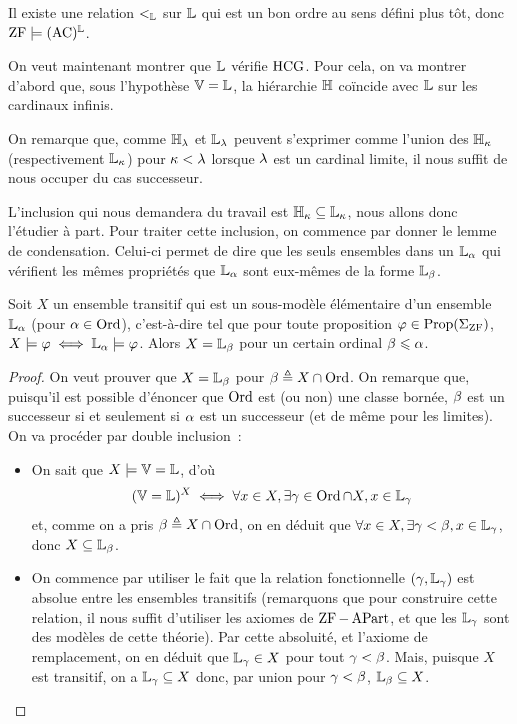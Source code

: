 \begin{corollary}
  Il existe une relation $<_{\mathbb L}$ sur $\mathbb L$ qui est un bon ordre au sens
  défini plus tôt, donc $\operatorname{ZF}\models (\operatorname{AC})^{\mathbb L}$.
\end{corollary}

On veut maintenant montrer que $\mathbb L$ vérifie $\operatorname{HCG}$.
Pour cela, on va montrer d'abord que, sous l'hypothèse $\mathbb V = \mathbb L$, la hiérarchie
$\mathbb H$ coïncide avec $\mathbb L$ sur les cardinaux infinis.

On remarque que, comme $\mathbb H_\lambda$ et $\mathbb L_\lambda$ peuvent s'exprimer comme
l'union des $\mathbb H_\kappa$ (respectivement $\mathbb L_\kappa$) pour $\kappa < \lambda$
lorsque $\lambda$ est un cardinal limite, il nous suffit de nous occuper du cas
successeur.

L'inclusion qui nous demandera du travail est $\mathbb H_\kappa \subseteq\mathbb L_\kappa$,
nous allons donc l'étudier à part. Pour traiter cette inclusion, on commence
par donner le lemme de condensation. Celui-ci permet de dire que les seuls
ensembles dans un $\mathbb L_{\alpha}$ qui vérifient les mêmes propriétés que $\mathbb L_{\alpha}$ sont
eux-mêmes de la forme $\mathbb L_{\beta}$.

\begin{lemma}[Condensation]
  Soit $X$ un ensemble transitif qui est un sous-modèle élémentaire d'un
  ensemble $\mathbb L_{\alpha}$ (pour $\alpha \in \operatorname{Ord}$), c'est-à-dire tel que pour toute
  proposition $\varphi\in\operatorname{Prop}(\Sigma_{\operatorname{ZF}})$,
  $X\models \varphi\iff \mathbb L_{\alpha}\models\varphi$. Alors $X = \mathbb L_{\beta}$ pour un
  certain ordinal $\beta \leqslant \alpha$.
\end{lemma}

\begin{proof}
  On veut prouver que $X = \mathbb L_{\beta}$ pour $\beta \triangleq X \cap \operatorname{Ord}$. On
  remarque que, puisqu'il est possible d'énoncer que $\operatorname{Ord}$ est (ou non) une
  classe bornée, $\beta$ est un successeur si et seulement si $\alpha$ est un
  successeur (et de même pour les limites). On va procéder par double
  inclusion~:
  \begin{itemize}
  \item[\fbox{$\subseteq$}] On sait que $X\models\mathbb V = \mathbb L$, d'où
    \[(\mathbb V = \mathbb L)^X \iff\forall x\in X,\exists\gamma\in\operatorname{Ord}\cap X, x\in\mathbb L_{\gamma}\]
    et, comme on a pris $\beta \triangleq X \cap \operatorname{Ord}$, on en déduit que
    $\forall x \in X, \exists \gamma < \beta, x \in \mathbb L_{\gamma}$, donc
    $X \subseteq \mathbb L_{\beta}$.
  \item[\fbox{$\supseteq$}] On commence par utiliser le fait que la relation
    fonctionnelle $(\gamma,\mathbb L_{\gamma})$ est absolue entre les ensembles
    transitifs (remarquons que pour construire cette relation, il nous suffit
    d'utiliser les axiomes de $\operatorname{ZF} - \operatorname{APart}$, et que les $\mathbb L_{\gamma}$ sont des
    modèles de cette théorie). Par cette absoluité, et l'axiome de remplacement,
    on en déduit que $\mathbb L_{\gamma} \in X$ pour tout $\gamma < \beta$. Mais,
    puisque $X$ est transitif, on a $\mathbb L_{\gamma} \subseteq X$ donc, par union
    pour $\gamma < \beta$, $\mathbb L_{\beta}\subseteq X$. \qedhere
  \end{itemize}
\end{proof}

